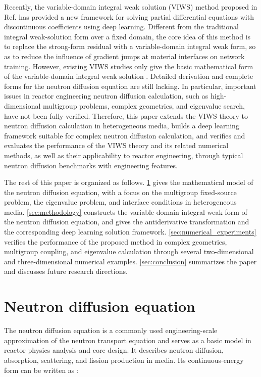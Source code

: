 \documentclass[final,3p,times,sort&compress]{elsarticle}
\begin{document}
Recently, the variable-domain integral weak solution (VIWS) method proposed in Ref. \cite{liu2026variabledomain} has provided a new framework for solving partial differential equations with discontinuous coefficients using deep learning. Different from the traditional integral weak-solution form over a fixed domain, the core idea of this method is to replace the strong-form residual with a variable-domain integral weak form, so as to reduce the influence of gradient jumps at material interfaces on network training. However, existing VIWS studies only give the basic mathematical form of the variable-domain integral weak solution \cite{liu2026variabledomain, liu2026supplementary}. Detailed derivation and complete forms for the neutron diffusion equation are still lacking. In particular, important issues in reactor engineering neutron diffusion calculation, such as high-dimensional multigroup problems, complex geometries, and eigenvalue search, have not been fully verified.
Therefore, this paper extends the VIWS theory to neutron diffusion calculation in heterogeneous media, builds a deep learning framework suitable for complex neutron diffusion calculation, and verifies and evaluates the performance of the VIWS theory and its related numerical methods, as well as their applicability to reactor engineering, through typical neutron diffusion benchmarks with engineering features.

The rest of this paper is organized as follows. \cref{sec:neutron_diffusion_equation} gives the mathematical model of the neutron diffusion equation, with a focus on the multigroup fixed-source problem, the eigenvalue problem, and interface conditions in heterogeneous media. \cref{sec:methodology} constructs the variable-domain integral weak form of the neutron diffusion equation, and gives the antiderivative transformation and the corresponding deep learning solution framework. \cref{sec:numerical_experiments} verifies the performance of the proposed method in complex geometries, multigroup coupling, and eigenvalue calculation through several two-dimensional and three-dimensional numerical examples. \cref{sec:conclusion} summarizes the paper and discusses future research directions.

\section{Neutron diffusion equation}
\label{sec:neutron_diffusion_equation}

The neutron diffusion equation is a commonly used engineering-scale approximation of the neutron transport equation and serves as a basic model in reactor physics analysis and core design. It describes neutron diffusion, absorption, scattering, and fission production in media. Its continuous-energy form can be written as \cite{xie2020nuclear}:
\end{document}
